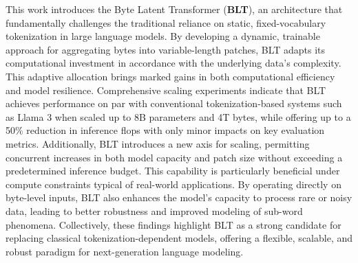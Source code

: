 This work introduces the Byte Latent Transformer (\textbf{BLT}), an architecture that fundamentally challenges the traditional reliance on static, fixed-vocabulary tokenization in large language models. By developing a dynamic, trainable approach for aggregating bytes into variable-length patches, {\textsc BLT} adapts its computational investment in accordance with the underlying data's complexity. This adaptive allocation brings marked gains in both computational efficiency and model resilience. Comprehensive scaling experiments indicate that {\textsc BLT} achieves performance on par with conventional tokenization-based systems such as Llama 3 when scaled up to 8B parameters and 4T bytes, while offering up to a 50\% reduction in inference flops with only minor impacts on key evaluation metrics. Additionally, {\textsc BLT} introduces a new axis for scaling, permitting concurrent increases in both model capacity and patch size without exceeding a predetermined inference budget. This capability is particularly beneficial under compute constraints typical of real-world applications. By operating directly on byte-level inputs, {\textsc BLT} also enhances the model's capacity to process rare or noisy data, leading to better robustness and improved modeling of sub-word phenomena. Collectively, these findings highlight {\textsc BLT} as a strong candidate for replacing classical tokenization-dependent models, offering a flexible, scalable, and robust paradigm for next-generation language modeling.

